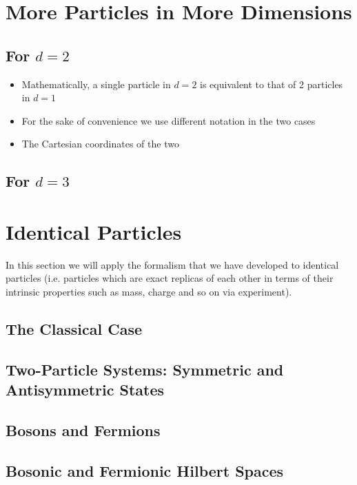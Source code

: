\section{More Particles in More Dimensions}
\subsection{For $d=2$}
\begin{itemize}
\item Mathematically, a single particle in $d=2$ is equivalent to that of 2 particles in $d=1$
\item For the sake of convenience we use different notation in the two cases
\item The Cartesian coordinates of the two 
\end{itemize}
\subsection{For $d=3$}
\section{Identical Particles}
In this section we will apply the formalism that we have developed to identical particles (i.e. particles which are exact replicas of each other in terms of their intrinsic properties such as mass, charge and so on via experiment).
\subsection{The Classical Case}
\subsection{Two-Particle Systems: Symmetric and Antisymmetric States}
\subsection{Bosons and Fermions}
\subsection{Bosonic and Fermionic Hilbert Spaces}
